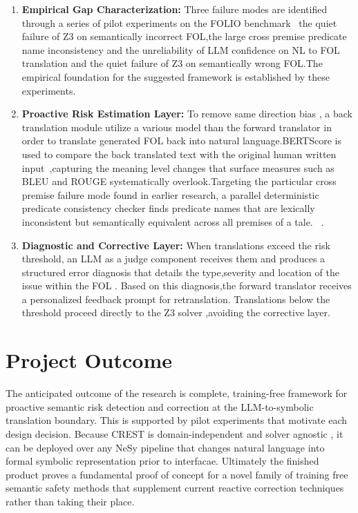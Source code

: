 \begin{enumerate}
    \item \textbf{Empirical Gap Characterization:} Three failure modes are identified  through a series of pilot experiments on the FOLIO benchmark~\cite{han2024folio} the quiet failure of Z3 on semantically incorrect FOL,the large cross premise predicate name inconsistency and the unreliability of LLM confidence on NL to FOL translation and the quiet failure of Z3 on semantically wrong FOL.The empirical foundation for the suggested framework is established by these experiments.

    \item \textbf{Proactive Risk Estimation Layer:} To remove same direction bias , a back translation module utilize a various model than the forward translator in order to translate generated FOL back into natural language.BERTScore is used to compare the back translated text with the original human written input~\cite{zhang2020bertscore},capturing the meaning level changes that surface measures such as BLEU and ROUGE systematically overlook.Targeting the particular cross premise failure mode found in earlier research, a parallel deterministic  predicate consistency checker finds predicate names that are lexically inconsistent but semantically equivalent across all premises of a tale. ~\cite{thatikonda2024strategies}.

    \item \textbf{Diagnostic and Corrective Layer:} When translations exceed the risk threshold, an LLM as a judge component receives them and produces a structured error diagnosis that details the type,severity and location of the issue within the FOL . Based on this diagnosis,the forward translator receives a personalized feedback prompt for retranslation. Translations below the threshold proceed directly to the Z3 solver ,avoiding the corrective layer.
\end{enumerate}

\section{Project Outcome}

The anticipated outcome of the research is complete, training-free framework for proactive semantic risk detection and correction at the LLM-to-symbolic translation boundary. This is supported by pilot experiments that motivate each design decision. Because CREST is domain-independent and solver agnostic , it can be deployed over any NeSy pipeline that changes natural language into formal symbolic representation prior to interfacae. Ultimately the finished product proves a fundamental proof of concept for a novel family of training free semantic safety methods that supplement current reactive correction techniques rather than taking their place.

